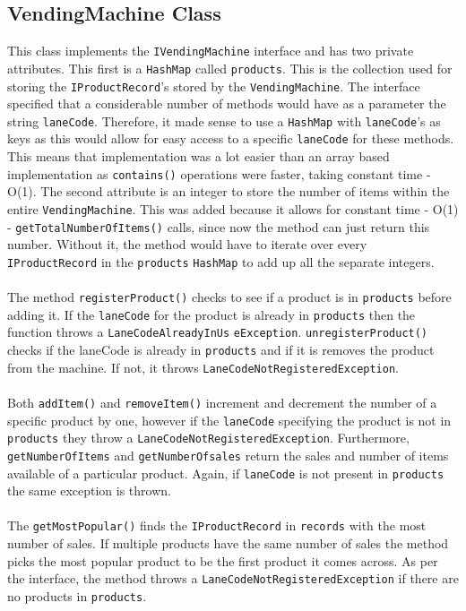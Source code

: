 \documentclass{article}
\begin{document}
\subsection{VendingMachine Class}
This class implements the \verb+IVendingMachine+ interface and has two private attributes. This first is a \verb+HashMap+ called \verb+products+. This is the collection used for storing the \verb+IProductRecord+'s stored by the \verb+VendingMachine+. The interface specified that a considerable number of methods would have as a parameter the string \verb+laneCode+. Therefore, it made sense to use a \verb+HashMap+ with \verb+laneCode+'s as keys as this would allow for easy access to a specific \verb+laneCode+ for these methods. This means that implementation was a lot easier than an array based implementation as \verb+contains()+ operations were faster, taking constant time - O(1). The second attribute is an integer to store the number of items within the entire \verb+VendingMachine+. This was added because it allows for constant time - O(1) - \verb+getTotalNumberOfItems()+ calls, since now the method can just return this number. Without it, the  method would have to iterate over every \verb+IProductRecord+ in the \verb+products+ \verb+HashMap+ to add up all the separate integers. \\ \\ \noindent The method \verb+registerProduct()+ checks to see if a product is in \verb+products+ before adding it. If the \verb+laneCode+ for the product is already in \verb+products+ then the function throws a \verb+LaneCodeAlreadyInUs+ \verb+eException+. \verb+unregisterProduct()+ checks if the laneCode is already in \verb+products+ and if it is removes the product from the machine. If not, it throws \verb+LaneCodeNotRegisteredException+. \\ \\ \noindent Both \verb+addItem()+ and \verb+removeItem()+ increment and decrement the number of a specific product by one, however if the \verb+laneCode+ specifying the product is not in \verb+products+ they throw a \verb+LaneCodeNotRegisteredException+. Furthermore, \verb+getNumberOfItems+ and \verb+getNumberOfsales+ return the sales and number of items available of a particular product. Again, if \verb+laneCode+ is not present in \verb+products+ the same exception is thrown. \\ \\ \noindent The \verb+getMostPopular()+ finds the \verb+IProductRecord+ in \verb+records+ with the most number of sales. If multiple products have the same number of sales the method picks the most popular product to be the first product it comes across. As per the interface, the method throws a \verb+LaneCodeNotRegisteredException+ if there are no products in \verb+products+.
\end{document}
